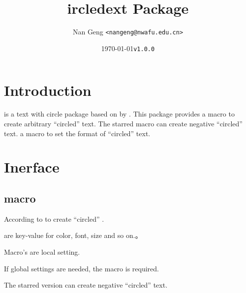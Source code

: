 \documentclass[full]{l3doc}
\def\vers{\texttt{v1.0.0} }
\begin{document}
\begin{documentation}
\title{
  ircledext Package 
}
\author{Nan Geng \texttt{<nangeng@nwafu.edu.cn>}}
\date{\today\qquad \vers}
\maketitle

\section{Introduction}

 is a text with circle package based on%
 by . This package provides a macro
 to create arbitrary ``circled'' text. The 
starred macro can create negative ``circled'' text.
a macro  to set the format of ``circled''
text.

\section{Inerface}

\subsection{ macro}

\begin{function}{\circledtext}
  \begin{syntax}
      
  \end{syntax}
\end{function}

  According to  to create ``circled''
  .

   are key-value for color, font, size and so on.。

  Macro's  are local setting.

  If global settings are needed, the  macro is required.

  The starred version can create negative ``circled'' text.

\begin{SideBySideExample}[frame=single,numbers=left,xrightmargin=.45\linewidth,gobble=2]
  \centering
  \quad
  \quad
  \quad
\end{SideBySideExample}

\end{documentation}
\end{document}
